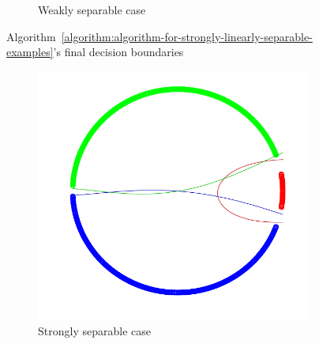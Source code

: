 \begin{figure}[h!]
\begin{subfigure}[b]{0.23\textwidth}
         \caption{Weakly separable case}
    \end{subfigure}
    \vspace*{-0.2cm}
    \caption{Algorithm~\ref{algorithm:algorithm-for-strongly-linearly-separable-examples}'s final decision boundaries}
    \label{fig:linearova-points}
\end{figure}

\begin{figure}[h!]
    \centering
    \begin{subfigure}[b]{0.23\textwidth}
        \captionsetup{justification=centering}
        \begin{center}
        \hspace*{-0.3cm} \includegraphics[width=1.15\textwidth, trim={0, 0cm, 0, 0}, clip]{figures/strong_rational_ova_points}
        \caption{Strongly separable case}
        \end{center}
    \end{subfigure}
    \hfill
    \begin{subfigure}[b]{0.23\textwidth}
        \captionsetup{justification=centering}
        \centering

\end{subfigure}
\end{figure}
